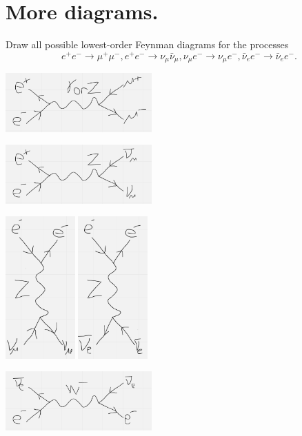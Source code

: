 \section{More diagrams.}

Draw all possible lowest-order Feynman diagrams for the processes 
$$e^+ e^- \to \mu^+ \mu^-, e^+ e^- \to \nu_\mu \bar{\nu}_\mu, \nu_\mu e^- \to \nu_\mu e^-, \bar{\nu}_e e^- \to \bar{\nu}_e e^-.$$

\begin{center}
    \includegraphics[width=0.42\textwidth]{q4_1.png}

    \includegraphics[width=0.42\textwidth]{q4_2.png}

    \includegraphics[width=0.2\textwidth]{q4_3.png}
    \includegraphics[width=0.2\textwidth]{q4_5.png}

    \includegraphics[width=0.42\textwidth]{q4_4.png}
\end{center}
